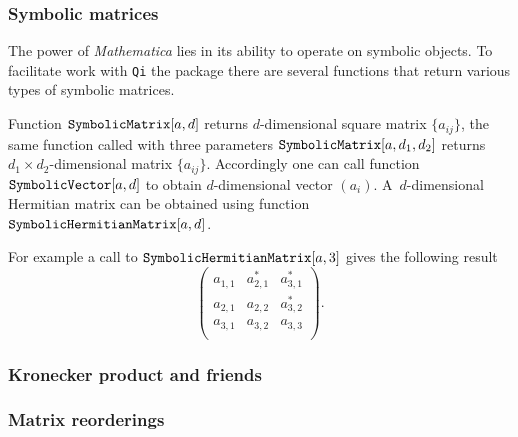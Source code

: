 \documentclass[11pt,a4paper]{article}
\newcommand{\qi}{\texttt{Qi}}
\newcommand{\Mathematica}{\emph{Mathematica}}
\newcommand{\1}{{\bf 1}}
\newcommand{\fname}[1]{\text{\texttt{#1}}}
\begin{document}
\subsubsection{Symbolic matrices}
The power of \Mathematica{} lies in its ability to operate on symbolic objects.
To facilitate work with \qi{} the package there are several functions that 
return various types of symbolic matrices.

Function $\fname{SymbolicMatrix}[a,d]$ returns $d$-dimensional square matrix 
$\{a_{ij}\}$, the same function called with three parameters 
$\fname{SymbolicMatrix}[a,d_1,d_2]$ returns $d_1 \times d_2$-dimensional 
matrix $\{a_{ij}\}$. Accordingly one can call function 
$\fname{SymbolicVector}[a,d]$ to obtain $d$-dimensional vector $(a_i)$.
A~$d$-dimensional Hermitian matrix can be obtained using function 
$\fname{SymbolicHermitianMatrix}[a,d]$. 

For example a call to $\fname{SymbolicHermitianMatrix}[a,3]$ gives the 
following result
\begin{equation}
\left(
\begin{array}{ccc}
 a_{1,1} & a_{2,1}^* & a_{3,1}^* \\
 a_{2,1} & a_{2,2} & a_{3,2}^* \\
 a_{3,1} & a_{3,2} & a_{3,3} \\
\end{array}
\right).
\end{equation}


\subsubsection{Kronecker product and friends}

\subsubsection{Matrix reorderings}

\end{document}
